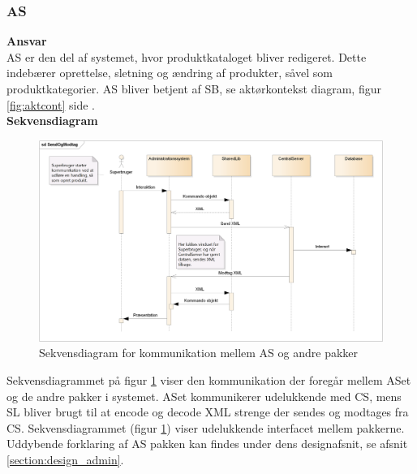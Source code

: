 \subsubsection{\gls{AS}}
\textbf{Ansvar}\\
\gls{AS} er den del af systemet, hvor produktkataloget bliver redigeret. Dette indebærer oprettelse, sletning og ændring af produkter, såvel som produktkategorier. \gls{AS} bliver betjent af \gls{SB}, se aktørkontekst diagram, figur \ref{fig:aktcont} side \pageref{fig:aktcont}.\\

\textbf{Sekvensdiagram}
\begin{figure}[H]
	\centering
	\includegraphics[width=\textwidth]{Systemarkitektur/LogiskView/Administrationssystem-sekvensdiagram}
	\caption{Sekvensdiagram for kommunikation mellem \gls{AS} og andre pakker}
	\label{fig:logview_admin_sekvensdiagram}
\end{figure}

Sekvensdiagrammet på figur \ref{fig:logview_admin_sekvensdiagram} viser den kommunikation der foregår mellem \gls{AS}et og de andre pakker i systemet. \gls{AS}et kommunikerer udelukkende med \gls{CS}, mens \gls{SL} bliver brugt til at encode og decode XML strenge der sendes og modtages fra \gls{CS}. Sekvensdiagrammet (figur \ref{fig:logview_admin_sekvensdiagram}) viser udelukkende interfacet mellem pakkerne. Uddybende forklaring af \gls{AS} pakken kan findes under dens designafsnit, se afsnit \ref{section:design_admin}.

